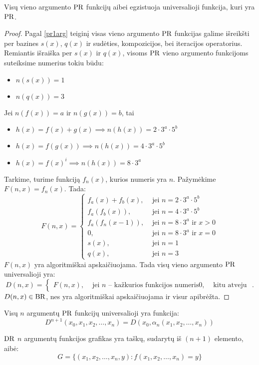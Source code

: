 \begin{prop}
  Visų vieno argumento $\mathop{\text{PR}}$ funkcijų aibei egzistuoja universalioji
  funkcija, kuri yra $\mathop{\text{PR}}$.
  \begin{proof}
    Pagal \ref{pr1arg} teiginį visas vieno argumento $\mathop{\text{PR}}$ funkcijas
    galime išreikšti per bazines $s(x)$, $q(x)$ ir sudėties, kompozicijos,
    bei iteracijos operatorius.
    Remiantis išraiška per $s(x)$ ir $q(x)$, visoms $\mathop{\text{PR}}$ vieno argumento
    funkcijoms suteiksime numerius tokiu būdu:
    \begin{itemize}
      \item $n(s(x)) = 1$
      \item $n(q(x)) = 3$
    \end{itemize}
    Jei $n(f(x)) = a$ ir $n(g(x)) = b$, tai
    \begin{itemize}
      \item $h(x) = f(x) + g(x) \implies n(h(x)) = 2 \cdot 3^a \cdot 5^b$
      \item $h(x) = f(g(x)) \implies n(h(x)) = 4 \cdot 3^a \cdot 5^b$
      \item $h(x) = f(x)^{i} \implies n(h(x)) = 8 \cdot 3^a$
    \end{itemize}
    Tarkime, turime funkciją $f_{n}(x)$, kurios numeris yra $n$. 
    Pažymėkime $F(n,x) = f_{n}(x)$. Tada:
    \[
    F(n,x) =%
    \begin{cases}
      f_{a}(x) + f_{b}(x), & \text{ jei } n = 2\cdot3^a\cdot5^b \\
      f_{a}(f_{b}(x)), & \text{ jei } n = 4\cdot3^a\cdot5^b \\
      f_{a}(f_{n}(x-1)), & \text{ jei } n = 8\cdot3^a \text{ ir } x > 0 \\
      0, & \text{ jei } n = 8\cdot3^a \text{ ir } x = 0 \\
      s(x), & \text{ jei } n = 1 \\
      q(x), & \text{ jei } n = 3
    \end{cases}
    \]
    $F(n,x)$ yra algoritmiškai apskaičiuojama. Tada visų vieno argumento
    $\mathop{\text{PR}}$ universalioji yra:
    \[
    D(n,x) =%
    \begin{cases}
      F(n,x), & \text{ jei $n$ – kažkurios funkcijos numeris}
      0, & \text{ kitu atveju }
    \end{cases}.
    \]
    $D(n,x) \in \mathop{\text{BR}}$, nes yra algoritmiškai apskaičiuojama ir visur 
    apibrėžta.
  \end{proof}
\end{prop}

\begin{prop}
  Visų $n$ argumentų $\mathop{\text{PR}}$ funkcijų universalioji yra funkcija:
  \[
  D^{n+1}(x_0,x_1,x_2,\dotsc,x_n) = D(x_0,\alpha_n(x_1,x_2,\dotsc,x_n))
  \]
\end{prop}

\begin{defn}
  $\mathop{\text{DR}}$ $n$ argumentų funkcijos grafikas yra taškų, sudarytų iš 
  $(n+1)$ elemento, aibė:
  \[
  G = \{ (x_1,x_2,\dotsc,x_n,y): f(x_1,x_2,\dotsc,x_n) = y \}
  \]
\end{defn}


